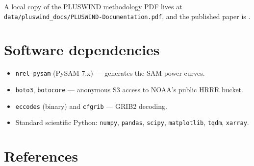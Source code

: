 \documentclass[11pt]{article}
\newcommand{\code}[1]{\texttt{\small #1}}
\begin{document}
A local copy of the PLUSWIND methodology PDF lives at
\code{data/pluswind\_docs/PLUSWIND-Documentation.pdf}, and the published
paper is \citet{millstein2023pluswind}.

\section{Software dependencies}
\label{app:deps}

\begin{itemize}[leftmargin=*]
  \item \code{nrel-pysam} (PySAM 7.x) --- generates the SAM power curves.
  \item \code{boto3}, \code{botocore} --- anonymous S3 access to NOAA's
        public HRRR bucket.
  \item \code{eccodes} (binary) and \code{cfgrib} --- GRIB2 decoding.
  \item Standard scientific Python: \code{numpy}, \code{pandas},
        \code{scipy}, \code{matplotlib}, \code{tqdm}, \code{xarray}.
\end{itemize}

\section*{References}
\label{sec:refs}
\end{document}

